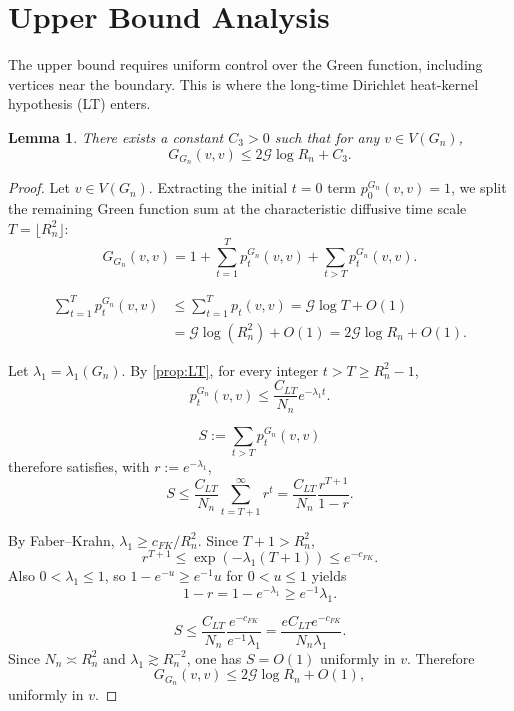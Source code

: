 \documentclass[reqno]{amsart}
\numberwithin{equation}{section}
\newtheorem{lemma}[lemma]{Lemma}
\theoremstyle{definition}
\theoremstyle{remark}
\newcommand{\Cref}[1]{\autoref{#1}}
\newcommand{\cG}{\mathcal{G}}
\begin{document}
\section{Upper Bound Analysis}\label{sec:upper_bound}

The upper bound requires uniform control over the Green function, including vertices near the boundary. This is where the long-time Dirichlet heat-kernel hypothesis (LT) enters.

\begin{lemma}\label{lem:upper}
There exists a constant $C_3 > 0$ such that for any $v \in V(G_n)$,
\[
G_{G_n}(v,v) \leq 2\cG \log R_n + C_3.
\]
\end{lemma}

\begin{proof}
Let $v \in V(G_n)$. Extracting the initial $t=0$ term $p_0^{G_n}(v,v)=1$, we split the remaining Green function sum at the characteristic diffusive time scale $T = \lfloor R_n^2 \rfloor$:
\[
G_{G_n}(v,v) = 1 + \sum_{t=1}^{T} p_t^{G_n}(v,v) + \sum_{t > T} p_t^{G_n}(v,v).
\]

\begin{align*}
\sum_{t=1}^{T} p_t^{G_n}(v,v) &\leq \sum_{t=1}^{T} p_t(v,v) = \cG \log T + O(1) \\
&= \cG \log(R_n^2) + O(1) = 2\cG \log R_n + O(1).
\end{align*}

Let $\lambda_1 = \lambda_1(G_n)$. By \Cref{prop:LT}, for every integer $t>T\ge R_n^2-1$,
\begin{equation}
p_t^{G_n}(v,v) \leq \frac{C_{LT}}{N_n} e^{-\lambda_1 t}.
\end{equation}

\[
S := \sum_{t > T} p_t^{G_n}(v,v)
\]
therefore satisfies, with $r:=e^{-\lambda_1}$,
\[
S \leq \frac{C_{LT}}{N_n} \sum_{t=T+1}^\infty r^t = \frac{C_{LT}}{N_n} \frac{r^{T+1}}{1-r}.
\]

By Faber--Krahn, $\lambda_1 \geq c_{FK}/R_n^2$. Since $T+1 > R_n^2$,
\[
  r^{T+1} \leq \exp(-\lambda_1(T+1)) \leq e^{-c_{FK}}.
\]
Also $0<\lambda_1\le 1$, so $1-e^{-u}\ge e^{-1}u$ for $0<u\le 1$ yields
\[
1-r = 1-e^{-\lambda_1} \ge e^{-1}\lambda_1.
\]

\[
S \leq \frac{C_{LT}}{N_n} \frac{e^{-c_{FK}}}{e^{-1}\lambda_1} = \frac{e C_{LT} e^{-c_{FK}}}{N_n \lambda_1}.
\]
Since $N_n \asymp R_n^2$ and $\lambda_1 \gtrsim R_n^{-2}$, one has $S=O(1)$ uniformly in $v$. Therefore
\[
G_{G_n}(v,v) \leq 2\cG \log R_n + O(1),
\]
uniformly in $v$.
\end{proof}
\end{document}

